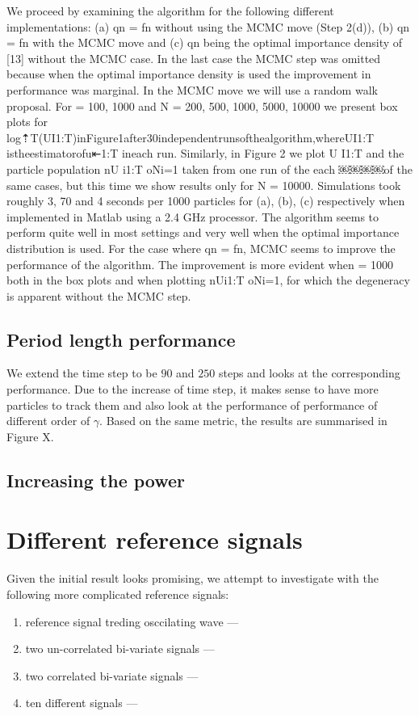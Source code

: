 We proceed by examining the algorithm for the following different implementations: (a) qn = fn without
using the MCMC move (Step 2(d)), (b) qn = fn with the MCMC move and (c) qn being the optimal importance density of [13] without the MCMC case. In the last case the MCMC step was omitted because when the optimal importance density is used the improvement in performance was marginal. In the MCMC move we will use a random walk proposal. For  = 100, 1000 and N = 200, 500, 1000, 5000, 10000 we present box plots for
log⇡T(UI1:T)inFigure1after30independentrunsofthealgorithm,whereUI1:T istheestimatorofu⇤1:T ineach run. Similarly, in Figure 2 we plot U I1:T and the particle population nU i1:T oNi=1 taken from one run of the each
￼￼￼￼of the same cases, but this time we show results only for N = 10000. Simulations took roughly 3, 70 and 4 seconds per 1000 particles for (a), (b), (c) respectively when implemented in Matlab using a 2.4 GHz processor. The algorithm seems to perform quite well in most settings and very well when the optimal importance distribution is used. For the case where qn = fn, MCMC seems to improve the performance of the algorithm.
The improvement is more evident when  = 1000 both in the box plots and when plotting nUi1:T oNi=1, for which the degeneracy is apparent without the MCMC step.

\subsection{Period length performance}
We extend the time step to be $90$ and $250$ steps and looks at the corresponding performance. Due to the increase of time step, it makes sense to have more particles to track them and also look at the performance of performance of different order of $\gamma$. Based on the same metric, the results are summarised in Figure X.

\subsection{Increasing the power}

\section{Different reference signals}
Given the initial result looks promising, we attempt to investigate with the following more complicated reference signals:
\begin{enumerate}
\item reference signal treding osccilating wave ---
\item two un-correlated bi-variate signals ---
\item two correlated bi-variate signals ---
\item ten different signals ---
\end{enumerate}


